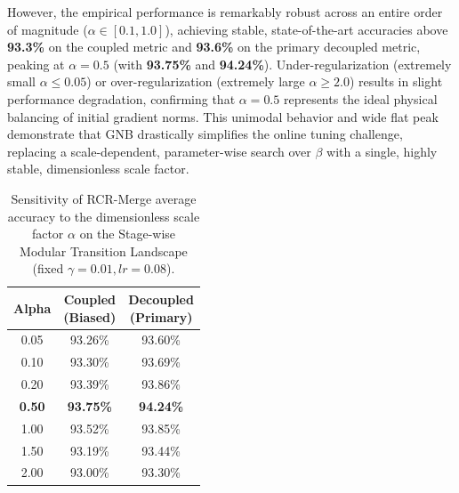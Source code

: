 However, the empirical performance is remarkably robust across an entire order of magnitude ($\alpha \in [0.1, 1.0]$), achieving stable, state-of-the-art accuracies above \textbf{93.3\%} on the coupled metric and \textbf{93.6\%} on the primary decoupled metric, peaking at $\alpha = 0.5$ (with \textbf{93.75\%} and \textbf{94.24\%}). Under-regularization (extremely small $\alpha \le 0.05$) or over-regularization (extremely large $\alpha \ge 2.0$) results in slight performance degradation, confirming that $\alpha = 0.5$ represents the ideal physical balancing of initial gradient norms. This unimodal behavior and wide flat peak demonstrate that GNB drastically simplifies the online tuning challenge, replacing a scale-dependent, parameter-wise search over $\beta$ with a single, highly stable, dimensionless scale factor.

\begin{table}[h]
\caption{Sensitivity of RCR-Merge average accuracy to the dimensionless scale factor $\alpha$ on the Stage-wise Modular Transition Landscape (fixed $\gamma = 0.01, lr = 0.08$).}
\label{tab:alpha_sensitivity}
\vskip 0.1in
\begin{center}
\begin{small}
\begin{sc}
\begin{tabular}{c|cc}
\toprule
Alpha & \shortstack{Coupled \\ (Biased)} & \shortstack{Decoupled \\ (Primary)} \\
\midrule
0.05 & 93.26\% & 93.60\% \\
0.10 & 93.30\% & 93.69\% \\
0.20 & 93.39\% & 93.86\% \\
\textbf{0.50} & \textbf{93.75\%} & \textbf{94.24\%} \\
1.00 & 93.52\% & 93.85\% \\
1.50 & 93.19\% & 93.44\% \\
2.00 & 93.00\% & 93.30\% \\
\bottomrule
\end{tabular}
\end{sc}
\end{small}
\end{center}
\vskip -0.1in
\end{table}

